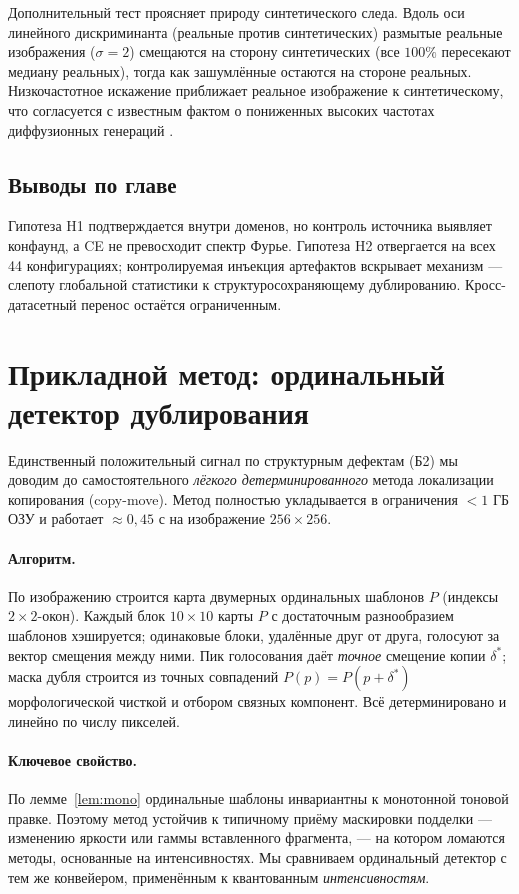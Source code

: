 \documentclass[14pt]{extarticle}
\theoremstyle{plain}
\numberwithin{equation}{section}
\numberwithin{figure}{section}
\numberwithin{table}{section}
\begin{document}
Дополнительный тест проясняет природу синтетического следа. Вдоль оси
линейного дискриминанта (реальные против синтетических) размытые реальные
изображения ($\sigma=2$) смещаются на сторону синтетических (все $100\%$
пересекают медиану реальных), тогда как зашумлённые остаются на стороне реальных.
Низкочастотное искажение приближает реальное изображение к синтетическому, что
согласуется с известным фактом о пониженных высоких частотах диффузионных
генераций \citep{corvi2023detection,tan2025fractal}.

\subsection*{Выводы по главе}
Гипотеза H1 подтверждается внутри доменов, но контроль источника выявляет
конфаунд, а CE не превосходит спектр Фурье. Гипотеза H2 отвергается на всех 44
конфигурациях; контролируемая инъекция артефактов вскрывает механизм — слепоту
глобальной статистики к структуросохраняющему дублированию. Кросс-датасетный
перенос остаётся ограниченным.

\section{Прикладной метод: ординальный детектор дублирования}\label{sec:copymove}

Единственный положительный сигнал по структурным дефектам (Б2) мы доводим до
самостоятельного \emph{лёгкого детерминированного} метода локализации копирования
(copy-move). Метод полностью укладывается в ограничения $<1$ ГБ ОЗУ и работает
$\approx0{,}45$ с на изображение $256\times256$.

\paragraph{Алгоритм.} По изображению строится карта двумерных ординальных шаблонов
$P$ (индексы $2\times2$-окон). Каждый блок $10\times10$ карты $P$ с достаточным
разнообразием шаблонов хэшируется; одинаковые блоки, удалённые друг от друга,
голосуют за вектор смещения между ними. Пик голосования даёт \emph{точное}
смещение копии $\delta^{*}$; маска дубля строится из точных совпадений
$P(p)=P(p+\delta^{*})$ морфологической чисткой и отбором связных компонент. Всё
детерминировано и линейно по числу пикселей.

\paragraph{Ключевое свойство.} По лемме~\ref{lem:mono} ординальные шаблоны
инвариантны к монотонной тоновой правке. Поэтому метод устойчив к типичному приёму
маскировки подделки — изменению яркости или гаммы вставленного фрагмента, — на
котором ломаются методы, основанные на интенсивностях. Мы сравниваем ординальный
детектор с тем же конвейером, применённым к квантованным \emph{интенсивностям}.
\end{document}
